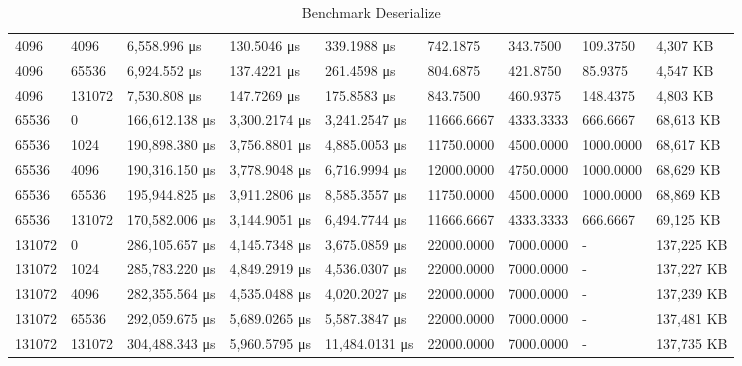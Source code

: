 \begin{table}[]
{\begin{tabular}{@{}lllllllll@{}}
    4096            & 4096            & 6,558.996 μs   & 130.5046 μs   & 339.1988 μs    & 742.1875   & 343.7500  & 109.3750  & 4,307 KB   \\
    4096            & 65536           & 6,924.552 μs   & 137.4221 μs   & 261.4598 μs    & 804.6875   & 421.8750  & 85.9375   & 4,547 KB   \\
    4096            & 131072          & 7,530.808 μs   & 147.7269 μs   & 175.8583 μs    & 843.7500   & 460.9375  & 148.4375  & 4,803 KB   \\
    65536           & 0               & 166,612.138 μs & 3,300.2174 μs & 3,241.2547 μs  & 11666.6667 & 4333.3333 & 666.6667  & 68,613 KB  \\
    65536           & 1024            & 190,898.380 μs & 3,756.8801 μs & 4,885.0053 μs  & 11750.0000 & 4500.0000 & 1000.0000 & 68,617 KB  \\
    65536           & 4096            & 190,316.150 μs & 3,778.9048 μs & 6,716.9994 μs  & 12000.0000 & 4750.0000 & 1000.0000 & 68,629 KB  \\
    65536           & 65536           & 195,944.825 μs & 3,911.2806 μs & 8,585.3557 μs  & 11750.0000 & 4500.0000 & 1000.0000 & 68,869 KB  \\
    65536           & 131072          & 170,582.006 μs & 3,144.9051 μs & 6,494.7744 μs  & 11666.6667 & 4333.3333 & 666.6667  & 69,125 KB  \\
    131072          & 0               & 286,105.657 μs & 4,145.7348 μs & 3,675.0859 μs  & 22000.0000 & 7000.0000 & -         & 137,225 KB \\
    131072          & 1024            & 285,783.220 μs & 4,849.2919 μs & 4,536.0307 μs  & 22000.0000 & 7000.0000 & -         & 137,227 KB \\
    131072          & 4096            & 282,355.564 μs & 4,535.0488 μs & 4,020.2027 μs  & 22000.0000 & 7000.0000 & -         & 137,239 KB \\
    131072          & 65536           & 292,059.675 μs & 5,689.0265 μs & 5,587.3847 μs  & 22000.0000 & 7000.0000 & -         & 137,481 KB \\
    131072          & 131072          & 304,488.343 μs & 5,960.5795 μs & 11,484.0131 μs & 22000.0000 & 7000.0000 & -         & 137,735 KB \\ \bottomrule
    \end{tabular}%
    }
    \caption{Benchmark Deserialize}
    \label{tab:benchmark-deserialize}
\end{table}